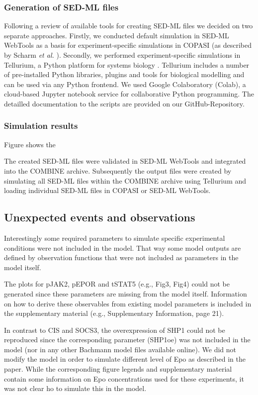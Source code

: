\subsubsection*{Generation of SED-ML files}

Following a review of available tools for creating SED-ML files \cite{sedmltool} we decided on two separate approaches. Firstly, we conducted default simulation in SED-ML WebTools as a basis for experiment-specific simulations in COPASI (as described by Scharm \textit{et al.} \cite{combine}). Secondly, we performed experiment-specific simulations in Tellurium, a Python platform for systems biology \cite{tellurium}. Tellurium includes a number of pre-installed Python libraries, plugins and tools for biological modelling and can be used via any Python frontend. We used Google Colaboratory (Colab), a cloud-based Jupyter notebook service for collaborative Python programming. The detailled documentation to the scripts are provided on our GitHub-Repository.

\subsubsection*{Simulation results}
Figure shows the 

The created SED-ML files were validated in SED-ML WebTools and integrated into the COMBINE archive. Subsequently the output files were created by simulating all SED-ML files within the COMBINE archive using Tellurium and loading individual SED-ML files in COPASI or SED-ML WebTools. 


\subsection*{Unexpected events and observations}
Interestingly some required parameters to simulate specific experimental conditions were not included in the model. That way some model outputs are defined by observation functions that were not included as parameters in the model itself. 

The plots for pJAK2, pEPOR and tSTAT5 (e.g., Fig3, Fig4) could not be generated since these parameters are missing from the model itself. Information on how to derive these observables from existing model parameters is included in the supplementary material (e.g., Supplementary Information, page 21). 

In contrast to CIS and SOCS3, the overexpression of SHP1 could not be reproduced since the corresponding parameter (SHP1oe) was not included in the model (nor in any other Bachmann model files available online). We did not modify the model in order to simulate different level of Epo as described in the paper. While the corresponding figure legends and supplementary material contain some information on Epo concentrations used for these experiments, it was not clear ho to simulate this in the model.

